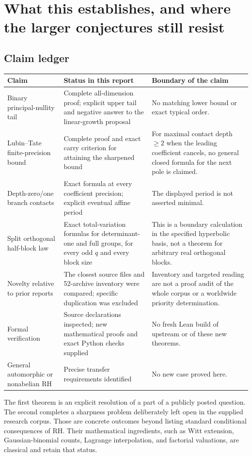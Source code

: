 \section{What this establishes, and where the larger conjectures still resist}
\label{sec:assessment}

\subsection{Claim ledger}

\begin{longtable}{P{.29\linewidth}P{.29\linewidth}P{.30\linewidth}}
\toprule
Claim & Status in this report & Boundary of the claim\\
\midrule\endhead
Binary principal-nullity tail & Complete all-dimension proof; explicit upper tail and negative answer to the linear-growth proposal & No matching lower bound or exact typical order.\\[5pt]
Lubin--Tate finite-precision bound & Complete proof and exact carry criterion for attaining the sharpened bound & For maximal contact depth $\ge2$ when the leading coefficient cancels, no general closed formula for the next pole is claimed.\\[5pt]
Depth-zero/one branch contacts & Exact formula at every coefficient precision; explicit eventual affine period & The displayed period is not asserted minimal.\\[5pt]
Split orthogonal half-block law & Exact total-variation formulas for determinant-one and full groups, for every odd $q$ and every block size & This is a boundary calculation in the specified hyperbolic basis, not a theorem for arbitrary real orthogonal blocks.\\[5pt]
Novelty relative to prior reports & The closest source files and 52-archive inventory were compared; specific duplication was excluded & Inventory and targeted reading are not a proof audit of the whole corpus or a worldwide priority determination.\\[5pt]
Formal verification & Source declarations inspected; new mathematical proofs and exact Python checks supplied & No fresh Lean build of upstream or of these new theorems.\\[5pt]
General automorphic or nonabelian RH & Precise transfer requirements identified & No new case proved here.\\
\bottomrule
\end{longtable}

The first theorem is an explicit resolution of a part of a publicly posted question. The second completes a sharpness problem deliberately left open in the supplied research corpus. Those are concrete outcomes beyond listing standard conditional consequences of RH. Their mathematical ingredients, such as Witt extension, Gaussian-binomial counts, Lagrange interpolation, and factorial valuations, are classical and retain that status.

